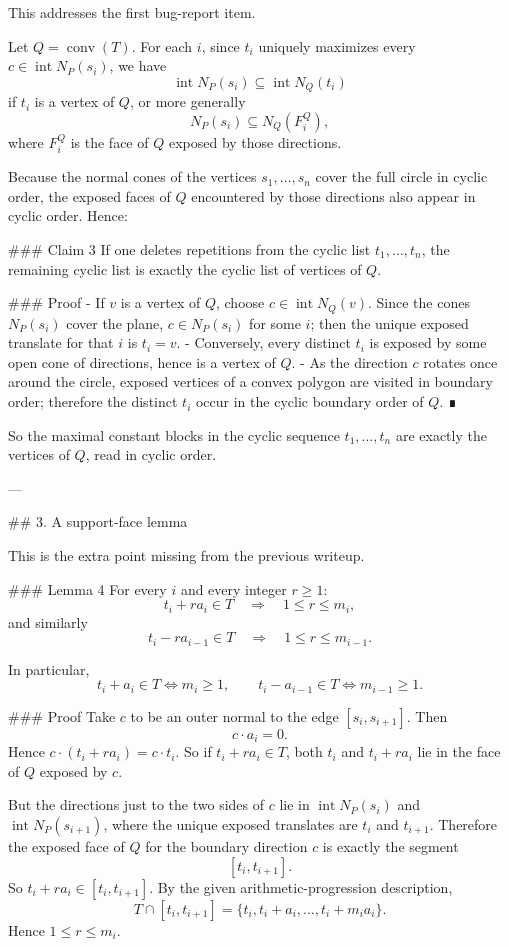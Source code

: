 This addresses the first bug-report item.

Let \(Q=\operatorname{conv}(T)\). For each \(i\), since \(t_i\) uniquely maximizes every \(c\in \operatorname{int}N_P(s_i)\), we have
\[
\operatorname{int}N_P(s_i)\subseteq \operatorname{int}N_Q(t_i)
\]
if \(t_i\) is a vertex of \(Q\), or more generally
\[
N_P(s_i)\subseteq N_Q(F_i^{Q}),
\]
where \(F_i^{Q}\) is the face of \(Q\) exposed by those directions.

Because the normal cones of the vertices \(s_1,\dots,s_n\) cover the full circle in cyclic order, the exposed faces of \(Q\) encountered by those directions also appear in cyclic order. Hence:

### Claim 3
If one deletes repetitions from the cyclic list \(t_1,\dots,t_n\), the remaining cyclic list is exactly the cyclic list of vertices of \(Q\).

### Proof
- If \(v\) is a vertex of \(Q\), choose \(c\in \operatorname{int}N_Q(v)\). Since the cones \(N_P(s_i)\) cover the plane, \(c\in N_P(s_i)\) for some \(i\); then the unique exposed translate for that \(i\) is \(t_i=v\).
- Conversely, every distinct \(t_i\) is exposed by some open cone of directions, hence is a vertex of \(Q\).
- As the direction \(c\) rotates once around the circle, exposed vertices of a convex polygon are visited in boundary order; therefore the distinct \(t_i\) occur in the cyclic boundary order of \(Q\). ∎

So the maximal constant blocks in the cyclic sequence \(t_1,\dots,t_n\) are exactly the vertices of \(Q\), read in cyclic order.

---

## 3. A support-face lemma

This is the extra point missing from the previous writeup.

### Lemma 4
For every \(i\) and every integer \(r\ge 1\):
\[
t_i+r a_i\in T \quad\Longrightarrow\quad 1\le r\le m_i,
\]
and similarly
\[
t_i-r a_{i-1}\in T \quad\Longrightarrow\quad 1\le r\le m_{i-1}.
\]

In particular,
\[
t_i+a_i\in T \iff m_i\ge1,
\qquad
t_i-a_{i-1}\in T \iff m_{i-1}\ge1.
\]

### Proof
Take \(c\) to be an outer normal to the edge \([s_i,s_{i+1}]\). Then
\[
c\cdot a_i=0.
\]
Hence \(c\cdot(t_i+r a_i)=c\cdot t_i\). So if \(t_i+r a_i\in T\), both \(t_i\) and \(t_i+r a_i\) lie in the face of \(Q\) exposed by \(c\).

But the directions just to the two sides of \(c\) lie in \(\operatorname{int}N_P(s_i)\) and \(\operatorname{int}N_P(s_{i+1})\), where the unique exposed translates are \(t_i\) and \(t_{i+1}\). Therefore the exposed face of \(Q\) for the boundary direction \(c\) is exactly the segment
\[
[t_i,t_{i+1}].
\]
So \(t_i+r a_i\in [t_i,t_{i+1}]\). By the given arithmetic-progression description,
\[
T\cap [t_i,t_{i+1}]
=
\{t_i,t_i+a_i,\dots,t_i+m_i a_i\}.
\]
Hence \(1\le r\le m_i\).

